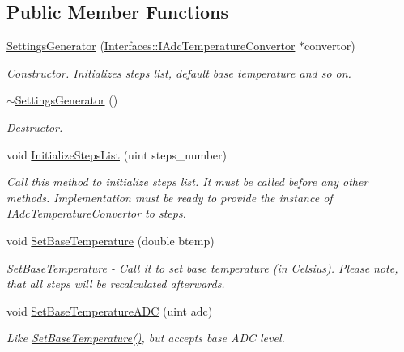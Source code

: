 \subsection*{Public Member Functions}
\begin{DoxyCompactItemize}
\item 
\hyperlink{class_settings_generator_a063e189547011b62a567ff55446341d7}{Settings\+Generator} (\hyperlink{class_interfaces_1_1_i_adc_temperature_convertor}{Interfaces\+::\+I\+Adc\+Temperature\+Convertor} $\ast$convertor)
\begin{DoxyCompactList}\small\item\em Constructor. Initializes steps list, default base temperature and so on. \end{DoxyCompactList}\item 
\mbox{\label{class_settings_generator_aeb8e3d3875929a6869aa93552f30599f}} 
\hyperlink{class_settings_generator_aeb8e3d3875929a6869aa93552f30599f}{$\sim$\+Settings\+Generator} ()
\begin{DoxyCompactList}\small\item\em Destructor. \end{DoxyCompactList}\item 
void \hyperlink{class_settings_generator_a84b81d11cb5f83d4066e73a03acfc143}{Initialize\+Steps\+List} (uint steps\+\_\+number)
\begin{DoxyCompactList}\small\item\em Call this method to initialize steps list. It must be called before any other methods. Implementation must be ready to provide the instance of I\+Adc\+Temperature\+Convertor to steps. \end{DoxyCompactList}\item 
void \hyperlink{class_settings_generator_aed9e7acb30bfd559b1ac70ceeddd8973}{Set\+Base\+Temperature} (double btemp)
\begin{DoxyCompactList}\small\item\em Set\+Base\+Temperature -\/ Call it to set base temperature (in Celsius). Please note, that all steps will be recalculated afterwards. \end{DoxyCompactList}\item 
void \hyperlink{class_settings_generator_a806478b651a98ce128e97c2da385c302}{Set\+Base\+Temperature\+A\+DC} (uint adc)
\begin{DoxyCompactList}\small\item\em Like \hyperlink{class_settings_generator_aed9e7acb30bfd559b1ac70ceeddd8973}{Set\+Base\+Temperature()}, but accepts base A\+DC level. \end{DoxyCompactList}\item 

\end{DoxyCompactItemize}
